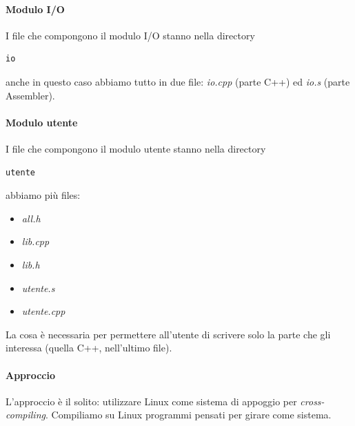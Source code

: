 \paragraph{Modulo I/O} I file che compongono il modulo I/O stanno nella directory
\begin{verbatim}io\end{verbatim}
anche in questo caso abbiamo tutto in due file: \emph{io.cpp} (parte C++) ed \emph{io.s} (parte Assembler).

\paragraph{Modulo utente} I file che compongono il modulo utente stanno nella directory
\begin{verbatim}utente\end{verbatim}
abbiamo più files: 
\begin{itemize}
	\item \emph{all.h}
	\item \emph{lib.cpp}
	\item \emph{lib.h}
	\item \emph{utente.s}
	\item \emph{utente.cpp}
\end{itemize}
La cosa è necessaria per permettere all'utente di scrivere solo la parte che gli interessa (quella C++, nell'ultimo file). 

\paragraph{Approccio} L'approccio è il solito: utilizzare Linux come sistema di appoggio per \emph{cross-compiling}.  Compiliamo su Linux programmi pensati per girare come sistema. 

